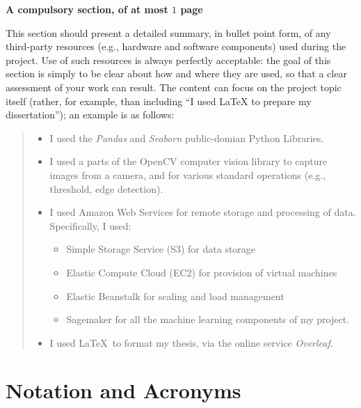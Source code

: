 \documentclass[ %
                    author={Natchalin Iwsakul \\ Inkaphol Siriwongwattana \\ Tanaphan Kummaraphat \\ Patorn Srisupap},
                supervisor={Fernando Moreno-Pino},
                    degree={MSc},
                     title={Propensity Modelling for SME Commercial Lending Using Open Public Data},
                  subtitle={Companies House filings and GDELT media coverage as predictors of first-time borrowing},
                      type={},
                      year={2026}]{dissertation}
\begin{document}
{\bf A compulsory section, of at most $1$ page}
\vspace{1cm} 

\noindent
This section should present a detailed summary, in bullet point form, 
of any third-party resources (e.g., hardware and software components) 
used during the project.  Use of such resources is always perfectly 
acceptable: the goal of this section is simply to be clear about how
and where they are used, so that a clear assessment of your work can
result.  The content can focus on the project topic itself (rather,
for example, than including ``I used \mbox{\LaTeX} to prepare my 
dissertation''); an example is as follows:

\begin{quote}
\noindent
\begin{itemize}

\item I used the {\em Pandas} and {\em Seaborn} public-domian Python Libraries. 

\item I used a parts of the OpenCV computer vision library to capture 
      images from a camera, and for various standard operations (e.g., 
      threshold, edge detection).

\item I used Amazon Web Services for remote storage and processing of data. Specifically, I used:
 \begin{itemize}
 \item Simple Storage Service (S3) for data storage
 \item Elastic Compute Cloud (EC2) for provision of virtual machines
 \item Elastic Beanstalk for scaling and load management
 \item Sagemaker for all the machine learning components of my project. 
 \end{itemize}
 
\item I used \LaTeX\ to format my thesis, via the online service {\em Overleaf}. 
\end{itemize}
\end{quote}


\chapter*{Notation and Acronyms}
\end{document}
